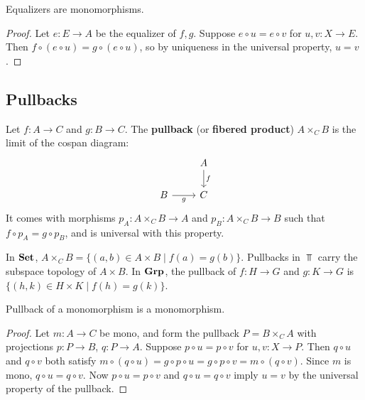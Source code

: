 \begin{proposition}
Equalizers are monomorphisms.
\end{proposition}

\begin{proof}
Let $e: E \to A$ be the equalizer of $f, g$. Suppose $e \circ u = e \circ v$ for $u, v: X \to E$. Then $f \circ (e \circ u) = g \circ (e \circ u)$, so by uniqueness in the universal property, $u = v$.
\end{proof}

\subsection{Pullbacks}

\begin{definition}[Pullback]
Let $f: A \to C$ and $g: B \to C$. The \textbf{pullback} (or \textbf{fibered product}) $A \times_C B$ is the limit of the cospan diagram:
\[
  \begin{tikzcd}
    & A \arrow[d, "f"] \\
    B \arrow[r, "g"'] & C
  \end{tikzcd}
\]
It comes with morphisms $p_A: A \times_C B \to A$ and $p_B: A \times_C B \to B$ such that $f \circ p_A = g \circ p_B$, and is universal with this property.
\end{definition}

\begin{example}
In $\mathbf{Set}$, $A \times_C B = \{(a,b) \in A \times B \mid f(a) = g(b)\}$. Pullbacks in $\Top$ carry the subspace topology of $A \times B$. In $\mathbf{Grp}$, the pullback of $f: H \to G$ and $g: K \to G$ is $\{(h,k) \in H \times K \mid f(h) = g(k)\}$.
\end{example}

\begin{proposition}
Pullback of a monomorphism is a monomorphism.
\end{proposition}

\begin{proof}
Let $m: A \to C$ be mono, and form the pullback $P = B \times_C A$ with projections $p: P \to B$, $q: P \to A$. Suppose $p \circ u = p \circ v$ for $u, v: X \to P$. Then $q \circ u$ and $q \circ v$ both satisfy $m \circ (q \circ u) = g \circ p \circ u = g \circ p \circ v = m \circ (q \circ v)$. Since $m$ is mono, $q \circ u = q \circ v$. Now $p \circ u = p \circ v$ and $q \circ u = q \circ v$ imply $u = v$ by the universal property of the pullback.
\end{proof}


